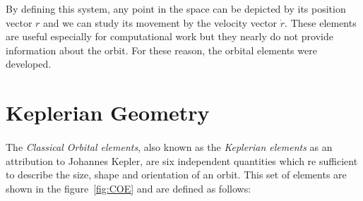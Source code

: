 By defining this system, any point in the space can be depicted by its position vector $r$ and we can study its movement by the velocity vector $\dot{r}$. These elements are useful especially for computational work but they nearly do not provide information about the orbit. For these reason, the orbital elements were developed.

\section{Keplerian Geometry}
\paragraph{}
The \textit{Classical Orbital elements}, also known as the \textit{Keplerian elements} as an attribution to Johannes Kepler, are six independent quantities which re sufficient to describe the size, shape and orientation of an orbit. This set of elements are shown in the figure~\ref{fig:COE} and are defined as follows:
